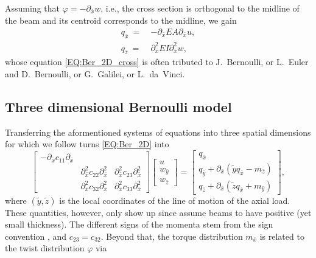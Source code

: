 \documentclass[a4paper, english, 12pt, reqno, draft]{amsart}
\theoremstyle{definition}
\theoremstyle{remark}
\numberwithin{equation}{section}
\newcommand{\longDef}{\ensuremath{u}}
\newcommand{\crossDef}{\ensuremath{w}}
\newcommand{\torsion}{\ensuremath{\varphi}}
\newcommand{\force}{\ensuremath{q}}
\newcommand{\momentum}{\ensuremath{m}}
\begin{document}
Assuming that $\torsion = - \partial_{\bar x} \crossDef$, i.e., the cross section is orthogonal to the midline of the beam and its centroid corresponds to the midline, we gain
% 
\begin{subequations}\label{EQ:Ber_2D}
 \begin{align}
  \force_{\bar x} ~=~ & - \partial_{\bar x}  EA \partial_{\bar x} \longDef, \label{EQ:beam_long_Ber}\\
  \force_{\bar z} ~=~ & \partial_{\bar x}^2 EI \partial_{\bar x}^2 \crossDef, \label{EQ:Ber_2D_cross}
 \end{align}
\end{subequations}
% 
whose equation \eqref{EQ:Ber_2D_cross} is often tributed to J.~Bernoulli, or  L.~Euler and D.~Bernoulli, or G.~Galilei, or L.~da~Vinci.
% 
\subsection{Three dimensional Bernoulli model}\label{SEC:3d_Ber}
% 
Transferring the aformentioned systems of equations into three spatial dimensions for which we follow \cite[Sect.~6.1--6.4]{BauchauC2009} turns \eqref{EQ:Ber_2D} into
% 
\begin{equation}\label{EQ:Ber_3D}
 \begin{bmatrix}
  -\partial_{\bar x} c_{11} \partial_{\bar x} & & \\
  & \partial^2_{\bar x} c_{22} \partial^2_{\bar x} & \partial^2_{\bar x} c_{23} \partial^2_{\bar x} \\
  & \partial^2_{\bar x} c_{32} \partial^2_{\bar x} & \partial^2_{\bar x} c_{33} \partial^2_{\bar x}
 \end{bmatrix}
 \begin{bmatrix}
  \longDef \\ \crossDef_{\bar y} \\ \crossDef_{\bar z}
 \end{bmatrix}
 =
 \begin{bmatrix}
  \force_{\bar x} \\ \force_{\bar y} + \partial_{\bar x} ( \tilde y \force_{\bar x} - \momentum_{\bar z} ) \\ \force_{\bar z} + \partial_{\bar x} ( \tilde z \force_{\bar x} + \momentum_{\bar y} )
 \end{bmatrix},
\end{equation}
% 
where $(\tilde y, \tilde z)$ is the local coordinates of the line of motion of the axial load. These quantities, however, only show up since \cite[Sect.~5--8]{BauchauC2009} assume beams to have positive (yet small thickness). The different signs of the momenta stem from the sign convention \cite[Sect.~5.2]{BauchauC2009}, and $c_{23} = c_{32}$. Beyond that, the torque distribution $\momentum_{\bar x}$ is related to the twist distribution $\torsion$ via
\end{document}
